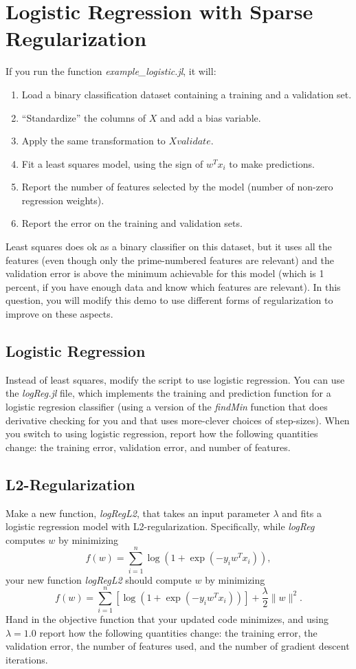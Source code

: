 \documentclass{article}
\def\blu#1{{\color{blu}#1}}
\def\norm#1{\|#1\|}
\def\enum#1{\begin{enumerate}#1\end{enumerate}}
\begin{document}
\section{Logistic Regression with Sparse Regularization}

If you run the function \emph{example\_logistic.jl}, it will:
\enum{
\item Load a binary classification dataset containing a training and a validation set.
\item ``Standardize'' the columns of $X$ and add a bias variable.
\item Apply the same transformation to $Xvalidate$.
\item Fit a least squares model, using the sign of $w^Tx_i$ to make predictions.
\item Report the number of features selected by the model (number of non-zero regression weights).
\item Report the error on the training and validation sets.
}
Least squares does ok as a binary classifier on this dataset, but it uses all the features (even though only the prime-numbered features are relevant) and the validation error is above the minimum achievable for this model (which is 1 percent, if you have enough data and know which features are relevant). In this question, you will modify this demo to use different forms of regularization to improve on these aspects.


\subsection{Logistic Regression}

Instead of least squares, modify the script to use logistic regression. You can use the \emph{logReg.jl} file, which implements the training and prediction function for a logistic regresion classifier (using a  version of the \emph{findMin} function that does derivative checking for you and that uses more-clever choices of step-sizes). When you switch to using logistic regression, \blu{report how the following quantities change: the training error, validation error, and number of features}.

\subsection{L2-Regularization}

Make a new function, \emph{logRegL2}, that takes an input parameter $\lambda$ and fits a logistic regression model with L2-regularization. Specifically, while \emph{logReg} computes $w$ by minimizing
\[
f(w) = \sum_{i=1}^n \log(1+\exp(-y_iw^Tx_i)),
\]
your new function \emph{logRegL2} should compute $w$ by minimizing
\[
f(w) = \sum_{i=1}^n \left[\log(1+\exp(-y_iw^Tx_i))\right] + \frac{\lambda}{2}\norm{w}^2.
\]
\blu{Hand in the objective function that your updated code minimizes, and using $\lambda=1.0$ report how the following quantities change: the training error, the validation error, the number of features used, and the number of gradient descent iterations.}
\end{document}

